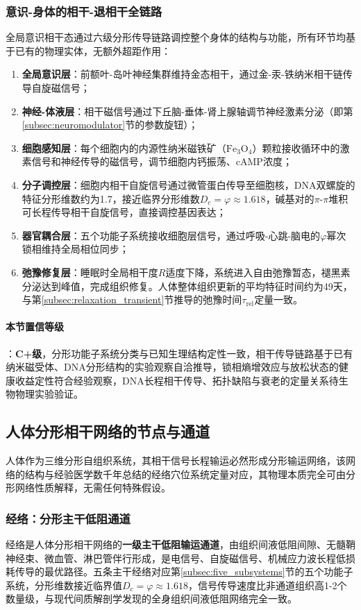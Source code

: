 \documentclass[12pt,a4paper,twocolumn]{article}
\renewcommand{\phi}{\varphi}
\begin{document}
\subsubsection{意识-身体的相干-退相干全链路}
全局意识相干态通过六级分形传导链路调控整个身体的结构与功能，所有环节均基于已有的物理实体，无额外超距作用：
\begin{enumerate}
\item \textbf{全局意识层}：前额叶-岛叶神经集群维持金态相干，通过金-汞-铁纳米相干链传导自旋磁信号；
\item \textbf{神经-体液层}：相干磁信号通过下丘脑-垂体-肾上腺轴调节神经激素分泌（即第\ref{subsec:neuromodulator}节的参数旋钮）；
\item \textbf{细胞感知层}：每个细胞内的内源性纳米磁铁矿（$\text{Fe}_3\text{O}_4$）颗粒接收循环中的激素信号和神经传导的磁信号，调节细胞内钙振荡、cAMP浓度；
\item \textbf{分子调控层}：细胞内相干自旋信号通过微管蛋白传导至细胞核，DNA双螺旋的特征分形维数约为1.7，接近临界分形维数$D_c=\phi\approx1.618$，碱基对的$\pi$-$\pi$堆积可长程传导相干自旋信号，直接调控基因表达；
\item \textbf{器官耦合层}：五个功能子系统接收细胞层信号，通过呼吸-心跳-脑电的$\phi$幂次锁相维持全局相位同步；
\item \textbf{弛豫修复层}：睡眠时全局相干度$R$适度下降，系统进入自由弛豫暂态，褪黑素分泌达到峰值，完成组织修复。人体整体组织更新的平均特征时间约为49天，与第\ref{subsec:relaxation_transient}节推导的弛豫时间$\tau_{\text{rel}}$定量一致。
\end{enumerate}

\paragraph{本节置信等级}：\textbf{C+级}，分形功能子系统分类与已知生理结构定性一致，相干传导链路基于已有纳米磁受体、DNA分形结构的实验观察自洽推导，锁相熵增效应与放松状态的健康收益定性符合经验观察，DNA长程相干传导、拓扑缺陷与衰老的定量关系待生物物理实验验证。


\subsection{人体分形相干网络的节点与通道}
\label{subsec:acupoint_meridian}
人体作为三维分形自组织系统，其相干信号长程输运必然形成分形输运网络，该网络的结构与经验医学数千年总结的经络穴位系统定量对应，其物理本质完全可由分形网络性质解释，无需任何特殊假设。

\subsubsection{经络：分形主干低阻通道}
经络是人体分形相干网络的\textbf{一级主干低阻输运通道}，由组织间液低阻间隙、无髓鞘神经束、微血管、淋巴管伴行形成，是电信号、自旋磁信号、机械应力波长程低损耗传导的最优路径。五条主干经络对应第\ref{subsec:five_subsystems}节的五个功能子系统，分形维数接近临界值$D_c=\phi\approx1.618$，信号传导速度比非通道组织高1-2个数量级，与现代间质解剖学发现的全身组织间液低阻网络完全一致。
\end{document}
